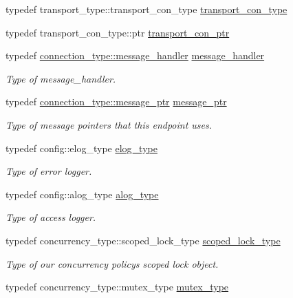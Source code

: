 \begin{DoxyCompactItemize}
typedef transport\+\_\+type\+::transport\+\_\+con\+\_\+type \hyperlink{classwebsocketpp_1_1endpoint_aaec9d745cafcee505c63efff421e3dff}{transport\+\_\+con\+\_\+type}
\item 
typedef transport\+\_\+con\+\_\+type\+::ptr \hyperlink{classwebsocketpp_1_1endpoint_a22be3833280c548d724298eba0f00b2a}{transport\+\_\+con\+\_\+ptr}
\item 
typedef \hyperlink{classwebsocketpp_1_1connection_a0091551000546d5f5f427379d852cae9}{connection\+\_\+type\+::message\+\_\+handler} \hyperlink{classwebsocketpp_1_1endpoint_afa2109f793a8d8d90599ea339bbcd8e5}{message\+\_\+handler}
\begin{DoxyCompactList}\small\item\em Type of message\+\_\+handler. \end{DoxyCompactList}\item 
typedef \hyperlink{classwebsocketpp_1_1connection_a3b98c091caf54540024538d2394ffb57}{connection\+\_\+type\+::message\+\_\+ptr} \hyperlink{classwebsocketpp_1_1endpoint_a585ecbbfd9689d4e4229e4c8378bd672}{message\+\_\+ptr}
\begin{DoxyCompactList}\small\item\em Type of message pointers that this endpoint uses. \end{DoxyCompactList}\item 
typedef config\+::elog\+\_\+type \hyperlink{classwebsocketpp_1_1endpoint_a4ab98f4fed5b5b2740105eff732c7b1e}{elog\+\_\+type}
\begin{DoxyCompactList}\small\item\em Type of error logger. \end{DoxyCompactList}\item 
typedef config\+::alog\+\_\+type \hyperlink{classwebsocketpp_1_1endpoint_a1ca2ad5bfdd241a031746c3f158f4003}{alog\+\_\+type}
\begin{DoxyCompactList}\small\item\em Type of access logger. \end{DoxyCompactList}\item 
typedef concurrency\+\_\+type\+::scoped\+\_\+lock\+\_\+type \hyperlink{classwebsocketpp_1_1endpoint_ae16d71c671d97d4b29c5fd5806d45815}{scoped\+\_\+lock\+\_\+type}
\begin{DoxyCompactList}\small\item\em Type of our concurrency policy\textquotesingle{}s scoped lock object. \end{DoxyCompactList}\item 
typedef concurrency\+\_\+type\+::mutex\+\_\+type \hyperlink{classwebsocketpp_1_1endpoint_ab4aa523f6e1fddb2e77cdf7b36771992}{mutex\+\_\+type}

\end{DoxyCompactItemize}
